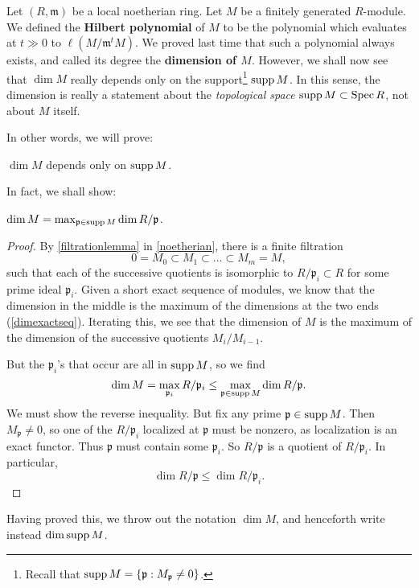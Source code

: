 Let $(R, \mathfrak{m})$ be a local noetherian ring. Let $M$ be a finitely generated
$R$-module. 	We defined the \textbf{Hilbert polynomial} of $M$ to be the
polynomial which evaluates at $t \gg 0$ to $\ell(M/\mathfrak{m}^tM)$. We proved
last time that such a polynomial always exists, and called its degree the
\textbf{dimension of $M$}. However, 
we shall now see that $\dim M$ really depends only on the support\footnote{
Recall that $\operatorname{supp} M = \left\{\mathfrak{p}: M_{\mathfrak{p}}\neq 0\right\}$.} $\operatorname{supp} M$.
In this sense, the dimension is really a statement about the \emph{topological
space} $\operatorname{supp} M \subset \operatorname{Spec} R$, not about $M$ itself. 


In other words, we will prove:
\begin{proposition} 
$\dim M$ depends only on $\operatorname{supp} M$.
\end{proposition} 

In fact, we shall show:

\begin{proposition} 
$\dim M = \max_{\mathfrak{p} \in \operatorname{supp} M} \dim R/\mathfrak{p}$.
\end{proposition} 
\begin{proof} 
By \cref{filtrationlemma} in \cref{noetherian}, there is a finite filtration 
\[ 0 = M_0 \subset M_1 \subset \dots \subset M_m = M,  \]
such that each of the successive quotients is isomorphic to $R/\mathfrak{p}_i
\subset R$
for some prime ideal $\mathfrak{p}_i$. Given a short exact sequence
of modules, we know that the dimension in the middle is the maximum of the dimensions at the
two ends (\cref{dimexactseq}). Iterating this, we see that the
dimension of $M$ is the maximum of the
dimension of the successive quotients $M_i/M_{i-1}$.

But the $\mathfrak{p}_i$'s that occur
are all in $\operatorname{supp} M$, so we find 
\[ \dim M = \max_{\mathfrak{p}_i} R/\mathfrak{p}_i \leq \max_{\mathfrak{p} \in \operatorname{supp} M} \dim R/\mathfrak{p}.  \]
We must show the reverse inequality. But fix any prime $\mathfrak{p} \in \operatorname{supp}
M$. Then $M_{\mathfrak{p}} \neq 0$, so one of the $R/\mathfrak{p}_i$ localized
at  $\mathfrak{p}$ must be nonzero, as localization is an exact functor. Thus
$\mathfrak{p}$ must contain some $\mathfrak{p}_i$. So $R/\mathfrak{p}$ is a
quotient of $R/\mathfrak{p}_i$. In particular,
\[ \dim R/\mathfrak{p} \leq \dim R/\mathfrak{p}_i.  \]
\end{proof} 

Having proved this, we throw out the notation $\dim M$, and henceforth write
instead $\dim \operatorname{supp} M$.



